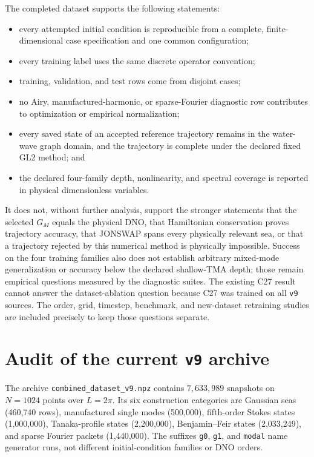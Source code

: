\documentclass[11pt]{article}
\begin{document}
The completed dataset supports the following statements:
\begin{itemize}
  \item every attempted initial condition is reproducible from a complete,
        finite-dimensional case specification and one common configuration;
  \item every training label uses the same discrete operator convention;
  \item training, validation, and test rows come from disjoint cases;
  \item no Airy, manufactured-harmonic, or sparse-Fourier diagnostic row
        contributes to optimization or empirical normalization;
  \item every saved state of an accepted reference trajectory remains in the
        water-wave graph domain, and the trajectory is complete under the
        declared fixed GL2 method; and
  \item the declared four-family depth, nonlinearity, and spectral coverage is
        reported in physical dimensionless variables.
\end{itemize}

It does not, without further analysis, support the stronger statements that
the selected $G_M$ equals the physical DNO, that Hamiltonian conservation proves trajectory
accuracy, that JONSWAP spans every physically relevant sea, or that a
trajectory rejected by this numerical method is physically impossible.
Success on the four training families also does not establish arbitrary
mixed-mode generalization or accuracy below the declared shallow-TMA depth;
those remain empirical questions measured by the diagnostic suites.  The
existing C27 result cannot answer the dataset-ablation question because C27
was trained on all \texttt{v9} sources.  The order, grid, timestep, benchmark,
and new-dataset retraining studies are included precisely to keep those
questions separate.

\appendix

\section{Audit of the current \texttt{v9} archive}
\label{sec:v9}

The archive \texttt{combined\_dataset\_v9.npz} contains $7{,}633{,}989$
snapshots on $N=1024$ points over $L=2\pi$.  Its six construction categories
are Gaussian seas (460,740 rows), manufactured single modes (500,000),
fifth-order Stokes states (1,000,000), Tanaka-profile states (2,200,000),
Benjamin--Feir states (2,033,249), and sparse Fourier packets (1,440,000).
The suffixes \texttt{g0}, \texttt{g1}, and \texttt{modal} name generator runs,
not different initial-condition families or DNO orders.
\end{document}
